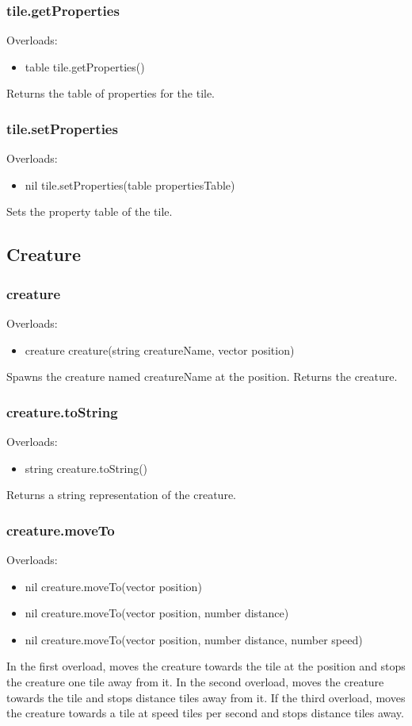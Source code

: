 \documentclass{book}
\newenvironment{ulist}
	{\begin{itemize}
			\itemsep0em}
	{\end{itemize}}
\begin{document}
\subsubsection{tile.getProperties}
Overloads:
\begin{ulist}
	\item table tile.getProperties()
\end{ulist}
Returns the table of properties for the tile.

\subsubsection{tile.setProperties}
Overloads:
\begin{ulist}
	\item nil tile.setProperties(table propertiesTable)
\end{ulist}
Sets the property table of the tile.

\subsection{Creature}
\subsubsection{creature}
Overloads:
\begin{ulist}
	\item creature creature(string creatureName, vector position)
\end{ulist}
Spawns the creature named creatureName at the position. Returns the creature.

\subsubsection{creature.toString}
Overloads:
\begin{ulist}
	\item string creature.toString()
\end{ulist}
Returns a string representation of the creature.

\subsubsection{creature.moveTo}
Overloads:
\begin{ulist}
	\item nil creature.moveTo(vector position)
	\item nil creature.moveTo(vector position, number distance)
	\item nil creature.moveTo(vector position, number distance, number speed)
\end{ulist}
In the first overload, moves the creature towards the tile at the position and stops the creature one tile away from it. In the second overload, moves the creature towards the tile and stops distance tiles away from it. If the third overload, moves the creature towards a tile at speed tiles per second and stops distance tiles away.
\end{document}

